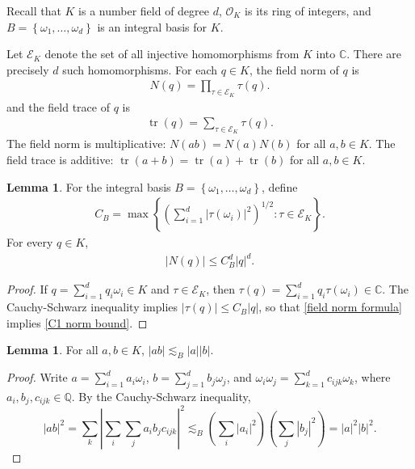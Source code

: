 \documentclass{amsart}
\numberwithin{equation}{section}
\theoremstyle{definition}
\newtheorem{lemma}[theorem]{Lemma}
\theoremstyle{definition}
\def\CC{\mathbb{C}}
\def\QQ{\mathbb{Q}}
\newcommand{\rbr}[1]{\left( {#1} \right)}
\newcommand{\cbr}[1]{ \left\{ {#1} \right\} }
\newcommand{\abs}[1]{\left| {#1} \right|}
\newcommand{\OK}{\mathcal{O}_K}
\DeclareMathOperator{\tr}{tr}
\begin{document}
Recall that $K$ is a number field of degree $d$, $\OK$ is its ring of integers, and $B = \cbr{\omega_1,\ldots,\omega_d}$ is an integral basis for $K$. 


Let $\mathcal{E}_K$ denote the set of all injective homomorphisms 
from $K$ into $\mathbb{C}$. There are precisely $d$ such homomorphisms. 
For each $q \in K$, the field norm of $q$ is 
\begin{align}\label{field norm formula}
N(q) 
=
\prod_{\tau \in \mathcal{E}_K} \tau(q).
\end{align}
and the field trace of $q$ is 
\begin{align}\label{field trace formula}
\tr(q) 
=
\sum_{\tau \in \mathcal{E}_K} \tau(q).
\end{align}
The field norm is multiplicative: 
$N(ab)=N(a)N(b)$ for all $a,b \in K$. 
The field trace is additive: 
$\tr(a+b)=\tr(a) + \tr(b)$ for all $a,b \in K$. 



\begin{lemma}\label{C1 bounds lemma}
For the integral basis $B = \cbr{\omega_1,\ldots,\omega_d}$, define 
\begin{align*}%
C_B = \max\cbr{ \textstyle \rbr{\sum_{i=1}^d |\tau(\omega_i)|^2}^{1/2} : \tau \in \mathcal{E}_K }.
\end{align*}
For every $q \in K$, 
\begin{align}\label{C1 norm bound}
|N(q)| \leq C_B^d |q|^d.
\end{align}
\end{lemma}
\begin{proof}
If $q = \sum_{i=1}^d q_i \omega_i \in K$ and $\tau \in \mathcal{E}_K$, then 
$\tau(q) = \sum_{i=1}^d q_i \tau(\omega_i) \in \CC$.  
The Cauchy-Schwarz inequality implies $|\tau(q)| \leq C_B|q|$, so that \eqref{field norm formula} implies \eqref{C1 norm bound}.
\end{proof}



\begin{lemma}
For all $a,b \in K$, $|ab| \lesssim_B |a||b|$.
\end{lemma}
\begin{proof}
Write $a = \sum_{i=1}^{d} a_i \omega_i$, 
$b = \sum_{j=1}^{d} b_j \omega_j$, and $\omega_i \omega_j = 
\sum_{k=1}^{d} c_{ijk} \omega_k$, where $a_i, b_j, c_{ijk} \in \QQ$. 
By the Cauchy-Schwarz inequality, 
$$
|ab|^2 
= 
\sum_{k}  \abs{\sum_i \sum_j a_i b_j c_{ijk} }^2
\lesssim_B \rbr{\sum_i |a_i|^2} \rbr{\sum_j |b_j|^2}
= |a|^2|b|^2. 
$$
\end{proof}
\end{document}
